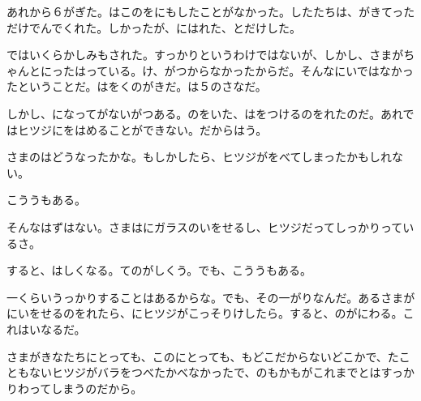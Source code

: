 あれから６がぎた。はこのをにもしたことがなかった。したたちは、がきてっただけでんでくれた。しかったが、にはれた、とだけした。

ではいくらかしみもされた。すっかりというわけではないが、しかし、さまがちゃんとにったはっている。け、がつからなかったからだ。そんなにいではなかったということだ。はをくのがきだ。は５のさなだ。

しかし、になってがないがつある。のをいた、はをつけるのをれたのだ。あれではヒツジにをはめることができない。だからはう。

さまのはどうなったかな。もしかしたら、ヒツジがをべてしまったかもしれない。

こううもある。

そんなはずはない。さまはにガラスのいをせるし、ヒツジだってしっかりっているさ。

すると、はしくなる。てのがしくう。でも、こううもある。

一くらいうっかりすることはあるからな。でも、その一がりなんだ。あるさまがにいをせるのをれたら、にヒツジがこっそりけしたら。すると、のがにわる。これはいなるだ。

さまがきなたちにとっても、このにとっても、もどこだからないどこかで、たこともないヒツジがバラをつべたかべなかったで、のもかもがこれまでとはすっかりわってしまうのだから。

